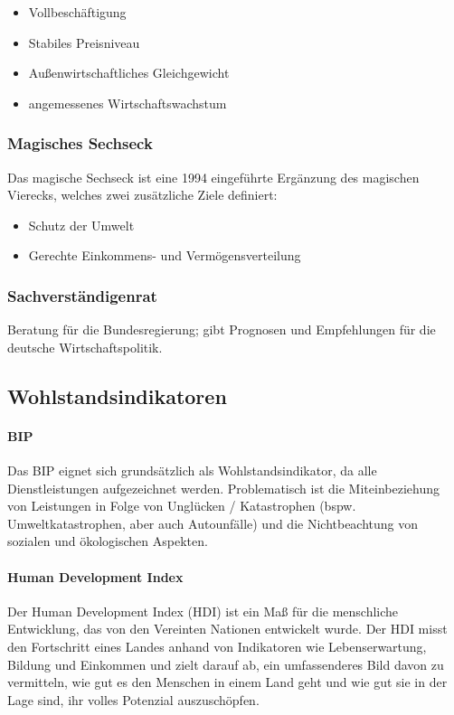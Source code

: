 \documentclass{article}
\begin{document}
	\begin{itemize}
		\item Vollbeschäftigung
		\item Stabiles Preisniveau
		\item Außenwirtschaftliches Gleichgewicht
		\item angemessenes Wirtschaftswachstum
	\end{itemize}

	\subsubsection{Magisches Sechseck}
	Das magische Sechseck ist eine 1994 eingeführte Ergänzung des magischen Vierecks, welches zwei zusätzliche Ziele definiert:

	\begin{itemize}
		\item Schutz der Umwelt
		\item Gerechte Einkommens- und Vermögensverteilung
	\end{itemize}

	\subsubsection{Sachverständigenrat}
	Beratung für die Bundesregierung; gibt Prognosen und Empfehlungen für die deutsche Wirtschaftspolitik.

	\subsection{Wohlstandsindikatoren}
	\paragraph{BIP}
	Das BIP eignet sich grundsätzlich als Wohlstandsindikator, da alle Dienstleistungen aufgezeichnet werden. Problematisch ist die Miteinbeziehung von Leistungen in Folge von Unglücken / Katastrophen (bspw. Umweltkatastrophen, aber auch Autounfälle) und die Nichtbeachtung von sozialen und ökologischen Aspekten.

	\paragraph{Human Development Index}
	Der Human Development Index (HDI) ist ein Maß für die menschliche Entwicklung, das von den Vereinten Nationen entwickelt wurde. Der HDI misst den Fortschritt eines Landes anhand von Indikatoren wie Lebenserwartung, Bildung und Einkommen und zielt darauf ab, ein umfassenderes Bild davon zu vermitteln, wie gut es den Menschen in einem Land geht und wie gut sie in der Lage sind, ihr volles Potenzial auszuschöpfen.
\end{document}
